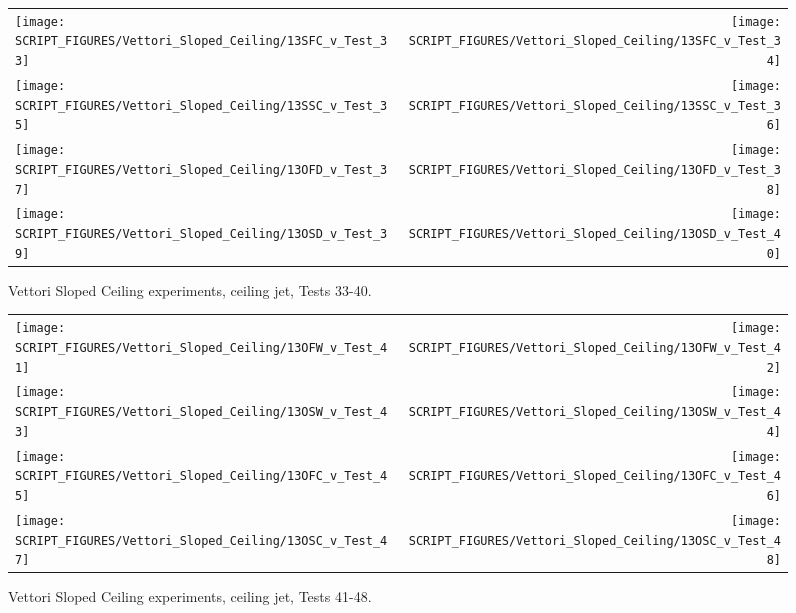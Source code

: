 \begin{figure}[p]
\begin{tabular*}{\textwidth}{l@{\extracolsep{\fill}}r}
\texttt{[image: SCRIPT\_FIGURES/Vettori\_Sloped\_Ceiling/13SFC\_v\_Test\_33]} &
\texttt{[image: SCRIPT\_FIGURES/Vettori\_Sloped\_Ceiling/13SFC\_v\_Test\_34]} \\
\texttt{[image: SCRIPT\_FIGURES/Vettori\_Sloped\_Ceiling/13SSC\_v\_Test\_35]} &
\texttt{[image: SCRIPT\_FIGURES/Vettori\_Sloped\_Ceiling/13SSC\_v\_Test\_36]} \\
\texttt{[image: SCRIPT\_FIGURES/Vettori\_Sloped\_Ceiling/13OFD\_v\_Test\_37]} &
\texttt{[image: SCRIPT\_FIGURES/Vettori\_Sloped\_Ceiling/13OFD\_v\_Test\_38]} \\
\texttt{[image: SCRIPT\_FIGURES/Vettori\_Sloped\_Ceiling/13OSD\_v\_Test\_39]} &
\texttt{[image: SCRIPT\_FIGURES/Vettori\_Sloped\_Ceiling/13OSD\_v\_Test\_40]} \\
\end{tabular*}
\caption{Vettori Sloped Ceiling experiments, ceiling jet, Tests 33-40.}
\label{Vettori_Sloped_5}
\end{figure}

\begin{figure}[p]
\begin{tabular*}{\textwidth}{l@{\extracolsep{\fill}}r}
\texttt{[image: SCRIPT\_FIGURES/Vettori\_Sloped\_Ceiling/13OFW\_v\_Test\_41]} &
\texttt{[image: SCRIPT\_FIGURES/Vettori\_Sloped\_Ceiling/13OFW\_v\_Test\_42]} \\
\texttt{[image: SCRIPT\_FIGURES/Vettori\_Sloped\_Ceiling/13OSW\_v\_Test\_43]} &
\texttt{[image: SCRIPT\_FIGURES/Vettori\_Sloped\_Ceiling/13OSW\_v\_Test\_44]} \\
\texttt{[image: SCRIPT\_FIGURES/Vettori\_Sloped\_Ceiling/13OFC\_v\_Test\_45]} &
\texttt{[image: SCRIPT\_FIGURES/Vettori\_Sloped\_Ceiling/13OFC\_v\_Test\_46]} \\
\texttt{[image: SCRIPT\_FIGURES/Vettori\_Sloped\_Ceiling/13OSC\_v\_Test\_47]} &
\texttt{[image: SCRIPT\_FIGURES/Vettori\_Sloped\_Ceiling/13OSC\_v\_Test\_48]} \\
\end{tabular*}
\caption{Vettori Sloped Ceiling experiments, ceiling jet, Tests 41-48.}
\label{Vettori_Sloped_6}
\end{figure}

